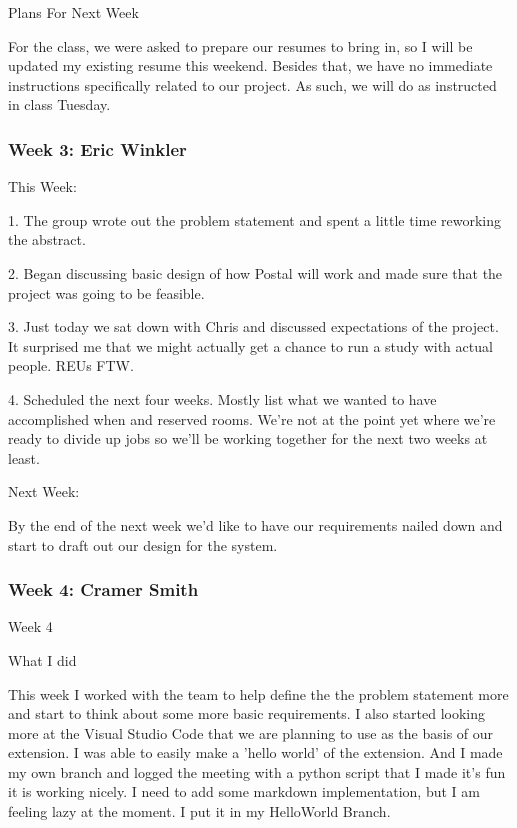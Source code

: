 Plans For Next Week

For the class, we were asked to prepare our resumes to bring in, so I will be updated my existing resume this weekend. Besides that, we have no immediate instructions specifically related to our project. As such, we will do as instructed in class Tuesday. \\ 

 \subsubsection{Week 3: Eric Winkler}

This Week: 

1. The group wrote out the problem statement and spent a little time reworking the abstract. 



2. Began discussing basic design of how Postal will work and made sure that the project was going to be feasible.



3. Just today we sat down with Chris and discussed expectations of the project. It surprised me that we might actually get a chance to run a study with actual people. REUs FTW. 



4. Scheduled the next four weeks. Mostly list what we wanted to have accomplished when and reserved rooms. We're not at the point yet where we're ready to divide up jobs so we'll be working together for the next two weeks at least.





Next Week: 



By the end of the next week we'd like to have our requirements nailed down and start to draft out our design for the system. \\ 

 \subsubsection{Week 4: Cramer Smith}

Week 4



What I did



This week I worked with the team to help define the the problem statement more and start to think about some more basic requirements. I also started looking more at the Visual Studio Code that we are planning to use as the basis of our extension. I was able to easily make a 'hello world' of the extension. And I made my own branch and logged the meeting with a python script that I made it's fun it is working nicely. I need to add some markdown implementation, but I am feeling lazy at the moment. I put it in my HelloWorld Branch.



